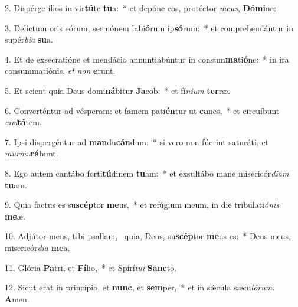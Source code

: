 2. Dispérge illos in vir\textbf{tú}te \textbf{tu}a:~*  et depóne eos, protéctor \textit{me}\textit{us}, \textbf{Dó}\textbf{mi}ne:\

3. Delíctum oris eórum, sermónem labi\textbf{ó}rum ip\textbf{só}rum:~*  et comprehendántur in supér\textit{bi}\textit{a} \textbf{su}a.\

4. Et de exsecratióne et mendácio annuntiabúntur in consum\textbf{ma}ti\textbf{ó}ne:~*  in ira consummatiónis, \textit{et} \textit{non} \textbf{e}runt.\

5. Et scient quia Deus domi\textbf{ná}bitur \textbf{Ja}cob:~*  et fí\textit{ni}\textit{um} \textbf{ter}ræ.\

6. Converténtur ad vésperam: et famem pati\textbf{én}tur ut \textbf{ca}nes,~*  et circuíbunt \textit{ci}\textit{vi}\textbf{tá}tem.\

7. Ipsi dispergéntur ad \textbf{man}du\textbf{cán}dum:~*  si vero non fúerint saturáti, et \textit{mur}\textit{mu}\textbf{rá}bunt.\

8. Ego autem cantábo forti\textbf{tú}dinem \textbf{tu}am:~*  et exsultábo mane misericór\textit{di}\textit{am} \textbf{tu}am.\

9. Quia factus es su\textbf{scép}tor \textbf{me}us,~*  et refúgium meum, in die tribulati\textit{ó}\textit{nis} \textbf{me}æ.\

10. Adjútor meus, tibi psallam, \dag\  quia, Deus, su\textbf{scép}tor \textbf{me}us es:~*  Deus meus, misericór\textit{di}\textit{a} \textbf{me}a.\

11. Glória \textbf{Pa}tri, et \textbf{Fí}lio,~*  et Spirí\textit{tu}\textit{i} \textbf{Sanc}to.\

12. Sicut erat in princípio, et \textbf{nunc}, et \textbf{sem}per,~*  et in sǽcula sæcu\textit{ló}\textit{rum}. \textbf{A}men.\

